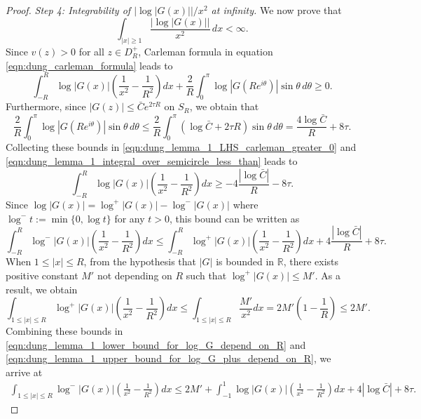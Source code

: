 \documentclass[11pt,twoside]{article} %
\begin{document}
\begin{proof}
\textit{Step 4: Integrability of $|\log|G(x)||/x^2$ at infinity.} We now prove that 
\begin{equation*}
    \int_{|x|\geq 1} \frac{|\log|G(x)||}{x^2}\,dx < \infty. 
\end{equation*}
Since $v(z) > 0$ for all $z \in D_R^+$, Carleman formula in equation \eqref{eqn:dung_carleman_formula} leads to
\begin{equation}
\label{eqn:dung_lemma_1_LHS_carleman_greater_0}
    \int_{-R}^R \log|G(x)| \left(\frac{1}{x^2} - \frac{1}{R^2}\right) dx + \frac{2}{R} \int_0^\pi \log|G(Re^{i\theta})| \sin\theta \, d\theta \geq 0.
\end{equation}
Furthermore, since $|G(z)| \le \bar{C} e^{2\tau R}$ on $S_R$, we obtain that
\begin{equation}
\label{eqn:dung_lemma_1_integral_over_semicircle_less_than}
    \frac{2}{R} \int_0^\pi \log|G(Re^{i\theta})| \sin\theta \, d\theta \le \frac{2}{R} \int_0^\pi (\log \bar{C} + 2\tau R) \sin\theta \, d\theta = \frac{4\log \bar{C}}{R} + 8\tau.
\end{equation}
Collecting these bounds in \eqref{eqn:dung_lemma_1_LHS_carleman_greater_0} and \eqref{eqn:dung_lemma_1_integral_over_semicircle_less_than} leads to
\begin{equation*}
    \int_{-R}^R \log|G(x)| \left(\frac{1}{x^2} - \frac{1}{R^2}\right) dx \ge -4\frac{|\log \bar{C}|}{R} - 8\tau.
\end{equation*}
Since $\log|G(x)| = \log^+|G(x)| - \log^-|G(x)|$ where $\log^- t := \min\{0, \log t\}$ for any $t > 0$, this bound can be written as 
\begin{equation}
    \label{eqn:dung_lemma_1_lower_bound_for_log_G_depend_on_R}
\int_{-R}^R \log^-|G(x)| \left(\frac{1}{x^2} - \frac{1}{R^2}\right) dx \le \int_{-R}^R \log^+|G(x)| \left(\frac{1}{x^2} - \frac{1}{R^2}\right) dx + 4\frac{|\log \bar{C}|}{R} + 8\tau.
\end{equation}
When $1 \le |x| \le R$, from the hypothesis that $|G|$ is bounded in $\mathbb{R}$, there exists positive constant $M'$ not depending on $R$ such that $\log^+|G(x)| \le M'$. As a result, we obtain
\begin{equation}
    \label{eqn:dung_lemma_1_upper_bound_for_log_G_plus_depend_on_R}
    \int_{1 \le |x| \le R} \log^+|G(x)| \left(\frac{1}{x^2} - \frac{1}{R^2}\right) dx \le \int_{1 \le |x| \le R} \frac{M'}{x^2} dx = 2M'\left(1 - \frac{1}{R}\right) \le 2M'.
\end{equation}
Combining these bounds in \eqref{eqn:dung_lemma_1_lower_bound_for_log_G_depend_on_R} and \eqref{eqn:dung_lemma_1_upper_bound_for_log_G_plus_depend_on_R}, we arrive at
\begin{align}
\int_{1 \le |x| \le R} \log^-|G(x)| \left(\frac{1}{x^2} - \frac{1}{R^2}\right) dx \le 2M' + \int_{-1}^1 \log|G(x)| \left(\frac{1}{x^2} - \frac{1}{R^2}\right) dx +  4|\log \bar{C}| + 8\tau. \label{eq:logarithmic_bound_7}
\end{align}


\end{proof}
\end{document}
